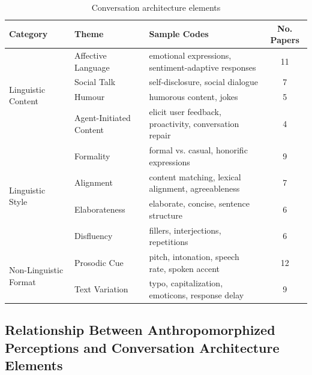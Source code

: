 \documentclass[sigconf,screen,review, anonymous]{acmart}
\begin{document}
\begin{table}[h]
\begin{tabular}{@{}lllc@{}}
\toprule
 \textbf{Category} & \textbf{Theme}      & \textbf{Sample Codes}                                      & \textbf{No. Papers} \\ \midrule
\multirow{4}{*}{Linguistic Content}    & Affective Language & emotional expressions, sentiment-adaptive responses & 11 \\
 & Social Talk           & self-disclosure, social dialogue                       & 7                                       \\
 & Humour                & humorous content, jokes                                & 5                                       \\
 & Agent-Initiated Content & elicit user feedback, proactivity, conversation repair & 4                                       \\ \midrule
\multirow{4}{*}{Linguistic Style}     & Formality          & formal vs. casual, honorific expressions                               & 9  \\
 & Alignment             & content matching, lexical alignment, agreeableness     & 7                                       \\
 & Elaborateness         & elaborate, concise, sentence structure                 & 6                                       \\
 & Disfluency            & fillers, interjections, repetitions                    & 6                                       \\ \midrule
\multirow{2}{*}{Non-Linguistic Format}     & Prosodic Cue            & pitch, intonation, speech rate, spoken accent                          & 12 \\
 & Text Variation        & typo, capitalization, emoticons, response delay & 9                                         \\ \bottomrule 
\end{tabular}%
\caption{Conversation architecture elements}
\label{tab:cues}
\end{table}

\subsection{Relationship Between Anthropomorphized Perceptions and Conversation Architecture Elements}
\end{document}

